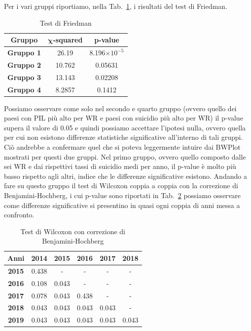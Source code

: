 \documentclass[conference]{IEEEtran}
\begin{document}
Per i vari gruppi riportiamo, nella Tab.~\ref{tab5}, i risultati del test di Friedman.
\begin{table}[htbp]
    \caption{Test di Friedman}
    \begin{center}
    \begin{tabular}{|c|c|c|}
    \hline
    \textbf{Gruppo} & $\boldsymbol{\chi}$\textbf{-squared} & \textbf{p-value} \\
    \hline
    \textbf{Gruppo 1} & 26.19 & 8.196$\times 10^{-5}$ \\\cline{1-3}
    \textbf{Gruppo 2} & 10.762 & 0.05631 \\\cline{1-3}
    \textbf{Gruppo 3} & 13.143 & 0.02208 \\\cline{1-3}
    \textbf{Gruppo 4} & 8.2857 & 0.1412 \\\cline{1-3}
    \hline
    \end{tabular}
    \label{tab5}
    \end{center}
\end{table}
Possiamo osservare come solo nel secondo e quarto gruppo 
(ovvero quello dei paesi con PIL più alto per WR e paesi con
suicidio più alto per WR)
il p-value supera il valore di 0.05
e quindi possiamo accettare l'ipotesi nulla, ovvero quella per cui non esistono differenze
statistiche significative all'interno di tali gruppi.
Ciò andrebbe a confermare quel che si poteva leggermente intuire dai BWPlot mostrati per questi
due gruppi.
Nel primo gruppo, ovvero quello composto dalle sei WR e dai rispettivi tassi di suicidio medi per
anno, il p-value è molto più basso rispetto agli altri, indice che
le differenze significative esistono. Andando a fare su questo gruppo il
test di Wilcoxon coppia a coppia con la correzione di Benjamini-Hochberg,
i cui p-value sono riportati in Tab.~\ref{tab6} possiamo osservare come
differenze significative si presentino in quasi ogni coppia di anni
messa a confronto.
\begin{table}[htbp]
    \caption{Test di Wilcoxon con correzione di Benjamini-Hochberg}
    \begin{center}
    \begin{tabular}{|c|c|c|c|c|c|}
    \hline
    \textbf{Anni} & \textbf{2014} & \textbf{2015} & \textbf{2016} & \textbf{2017} & \textbf{2018} \\
    \hline
    \textbf{2015} & 0.438 & - & - & - & - \\ \hline
    \textbf{2016} & 0.108 & 0.043 & - & - & - \\ \hline
    \textbf{2017} & 0.078 & 0.043 & 0.438 & - & - \\ \hline
    \textbf{2018} & 0.043 & 0.043 & 0.043 & 0.043 & - \\ \hline
    \textbf{2019} & 0.043 & 0.043 & 0.043 & 0.043 & 0.043 \\ 
    \hline
    \end{tabular}
    \label{tab6}
    \end{center}
\end{table}
\end{document}
